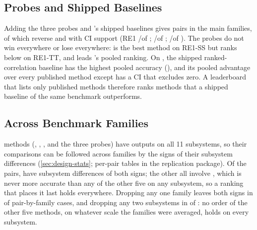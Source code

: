 \subsection{Probes and Shipped Baselines}
\label{sec:rq1-all}

Adding the three probes and \petshop's shipped baselines gives \NMainAllPairs pairs in the main families, of which \NMainAllRev reverse and \NMainAllRevCI with CI support (RE1 \NReOneAllRev/\NReOneAllRevCI of \NReOneAllPairs; \openrca \NOpenrcaAllRev/\NOpenrcaAllRevCI of \NOpenrcaAllPairs; \petshop \NPetshopAllRev/\NPetshopAllRevCI of \NPetshopAllPairs).
The probes do not win everywhere or lose everywhere: \cdmin is the best method on RE1-SS but ranks below \baro on RE1-TT, and \alertcount leads \openrca's pooled ranking.
On \petshop, the shipped ranked-correlation baseline has the highest pooled accuracy (\PetshopRankedCorrMean), and its pooled advantage over every published method except \circa has a CI that excludes zero.
A leaderboard that lists only published methods therefore ranks methods that a shipped baseline of the same benchmark outperforms.

\subsection{Across Benchmark Families}
\label{sec:rq1-cross}

\XNMethods methods (\baro, \rcd, \ediag, and the three probes) have outputs on all 11 subsystems, so their comparisons can be followed across families by the signs of their subsystem differences (\cref{sec:design-stats}; per-pair tables in the replication package).
Of the \XNPairs pairs, \XNBothSigns have subsystem differences of both signs; the other \XNOneSign all involve \ediag, which is never more accurate than any of the other five on any subsystem, so a ranking that places it last holds everywhere.
Dropping any one family leaves both signs in \XLofoBoth of \XLofoN pair-by-family cases, and dropping any two subsystems in \XLksoBoth of \XLksoN: no order of the other five methods, on whatever scale the families were averaged, holds on every subsystem.
